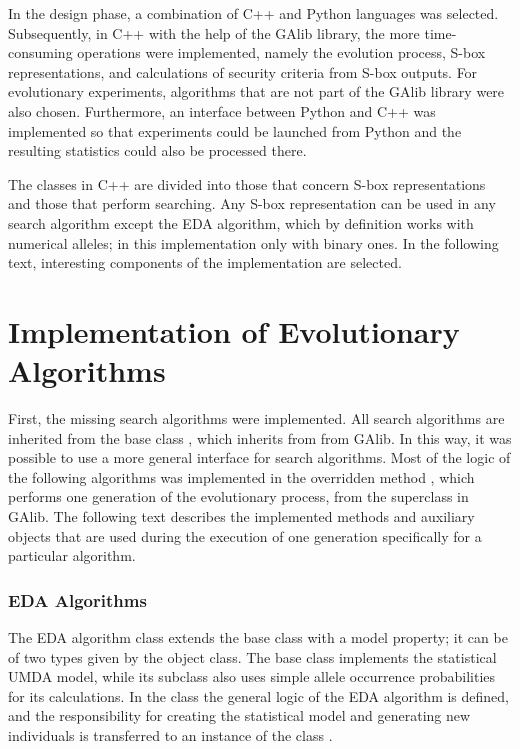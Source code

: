 %
%
%
%
%
In the design phase, a combination of C++ and Python languages was selected. Subsequently, in C++ with the help of
the GAlib library, the more time-consuming operations were implemented,
namely the evolution process, S-box representations,
and calculations of security criteria from S-box outputs.
For evolutionary experiments, algorithms that are not
part of the GAlib library were also chosen. Furthermore, an interface between
Python and C++ was implemented so that experiments could be launched from Python and the
resulting statistics could also be processed there.

The classes in C++ are divided into those that concern S-box representations and those that
perform searching. Any S-box representation can be used in any
search algorithm except the EDA algorithm, which by definition works with
numerical alleles; in this implementation only with binary ones.
In the following text, interesting components of the implementation are selected.

\section{Implementation of Evolutionary Algorithms}
First, the missing search algorithms were implemented. All
search algorithms are inherited from the base class ,
which inherits from  from GAlib. In this way, it was possible to use a more general
interface for search algorithms. Most of the logic of the following algorithms was
implemented in the overridden method ,
which performs one generation of the evolutionary process, from the superclass
 in GAlib. The following text describes the implemented
methods and auxiliary objects that are used during the execution of one generation
specifically for a particular algorithm.

\subsubsection{EDA Algorithms}
The EDA algorithm class extends the base class with a model property; it can be of two
types given by the object class. The base class  implements the statistical
UMDA model, while its subclass  also uses simple allele occurrence probabilities
for its calculations. In the class 
the general logic of the EDA algorithm is defined, and the responsibility for
creating the statistical model and generating new individuals is transferred
to an instance of the class .

